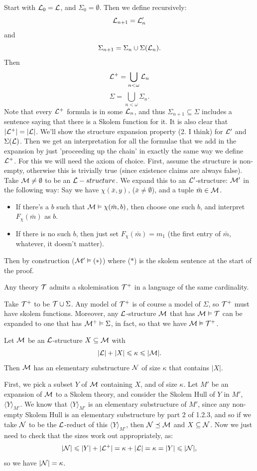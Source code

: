 \documentclass{article}
\numberwithin{thm}{subsection}
\begin{document}
Start with $\mathcal{L}_{0}= \mathcal{L}$, and $\Sigma_{0} = \emptyset$. Then we define recursively: \[ \mathcal{L}_{n+1} = \mathcal{L}_{n}'\] and \[ \Sigma_{n+1}=\Sigma_{n} \cup \Sigma(\mathcal{L}_{n}).\] Then \[ \mathcal{L}^{+} = \bigcup_{n<\omega} \mathcal{L}_{n}\] \[ \Sigma = \bigcup_{n< \omega} \Sigma_{n}.\] Note that every $\mathcal{L}^{+}$ formula is in some $\mathcal{L}_{n}$, and thus $\Sigma_{n+1} \subseteq \Sigma$ includes a sentence saying that there is a Skolem function for it. It is also clear that $|\mathcal{L}^{+}| = |\mathcal{L}|$. \gap We'll show the structure expansion property (2. I think) for $\mathcal{L}'$ and $\Sigma(\mathcal{L})$. Then we get an interpretation for all the formulae that we add in the expansion by just 'proceeding up the chain' in exactly the same way we define $\mathcal{L}^{+}$. For this we will need the axiom of choice. 
\gap First, assume the structure is non-empty, otherwise this is trivially true (since existence claims are always false). Take $\mathcal{M} \neq \emptyset$ to be an $\mathcal{L}-structure$. We expand this to an $\mathcal{L}'$-structure: $\mathcal{M}'$ in the following way: \gap Say we have $\chi( \bar x, y)$, ($\bar x \neq \emptyset$), and a tuple $\bar m \in \mathcal{M}$. \begin{itemize}
    \item If there's a $b$ such that $\mathcal{M} \vDash \chi(\bar m, b)$, then choose one such $b$, and interpret $F_{\chi}(\bar m)$ as $b$.
    \item If there is no such $b$, then just set $F_{\chi}(\bar m) = m_{1}$ (the first entry of $\bar m$, whatever, it doesn't matter).
\end{itemize}
Then by construction ($\mathcal{M}' \vDash (*)$) where ($*$) is the skolem sentence at the start of the proof. \endproof
\begin{corr}{} Any theory $\mathcal{T}$ admits a skolemisation $\mathcal{T}^{+}$ in a language of the same cardinality.
\end{corr}
\proof Take $\mathcal{T}^{+}$ to be $\mathcal{T} \cup \Sigma$. Any model of $\mathcal{T}^{+}$ is of course a model of $\Sigma$, so $\mathcal{T}^{+}$ must have skolem functions. Moreover, any $\mathcal{L}$-structure $\mathcal{M}$ that has $\mathcal{M} \vDash \mathcal{T}$ can be expanded to one that has $\mathcal{M}^{+} \vDash \Sigma$, in fact, so that we have $\mathcal{M} \vDash \mathcal{T}^{+}$.
\endproof 
\begin{corr}{} Let $\mathcal{M}$ be an $\mathcal{L}$-structure $X \subseteq \mathcal{M}$ with \[|\mathcal{L}| + |X| \leqslant \kappa \leqslant |\mathcal{M}|.\] Then $\mathcal{M}$ has an elementary substructure $\mathcal{N}$ of size $\kappa$ that contains $|X|$.
\end{corr}
\proof \newlec First, we pick a subset $Y$ of $\mathcal{M}$ containing $X$, and of size $\kappa$. Let $M'$ be an expansion of $\mathcal{M}$ to a Skolem theory, and consider the Skolem Hull of $Y$ in $M'$, $\langle Y \rangle_{M'}$. We know that $\langle Y \rangle_{M'}$ is an elementary substructure of $M'$, since any non-empty Skolem Hull is an elementary substructure by part 2 of 1.2.3, and so if we take $\mathcal{N}$ to be the $\mathcal{L}$-reduct of this $\langle Y \rangle_{M'}$, then $\mathcal{N} \preceq \mathcal{M}$ and $X \subseteq \mathcal{N}$. Now we just need to check that the sizes work out appropriately, as: \[ |\mathcal{N}|\leqslant |Y| + |\mathcal{L}^{+}| = \kappa + |\mathcal{L}| = \kappa = |Y| \leqslant |\mathcal{N}|,\] so we have $|\mathcal{N}| = \kappa$. \endproof
\end{document}

